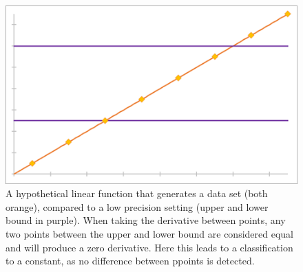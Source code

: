 \documentclass[main.tex]{subfiles}
\begin{document}
    \begin{figure}[h]
      \centering
      \includegraphics[width=0.6\linewidth]{figures/lowPrec}
      \caption{A hypothetical linear function that generates a data set (both orange), compared to a low precision setting (upper and lower bound in purple). When taking the derivative between points, any two points between the upper and lower bound are considered equal and will produce a zero derivative. Here this leads to a classification to a constant, as no difference between ppoints is detected.}
      \label{fig:lowPrec}
    \end{figure}
  
  
\end{document}
